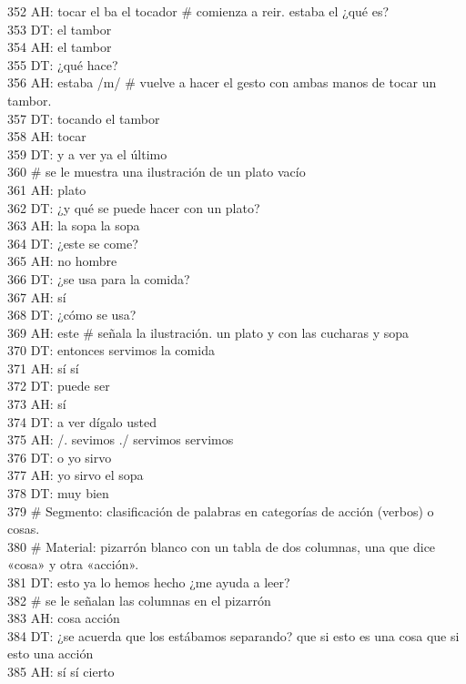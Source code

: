 352 AH: tocar el ba el tocador \# comienza a reir. estaba el ¿qué es?\\
353 DT: el tambor\\
354 AH: el tambor\\
355 DT: ¿qué hace?\\
356 AH: estaba /m/ \# vuelve a hacer el gesto con ambas manos de tocar un tambor.\\
357 DT: tocando el tambor\\
358 AH: tocar\\
359 DT: y a ver ya el último\\
360 \# se le muestra una ilustración de un plato vacío\\
361 AH: plato\\
362 DT: ¿y qué se puede hacer con un plato?\\
363 AH: la sopa la sopa\\
364 DT: ¿este se come?\\
365 AH: no hombre\\
366 DT: ¿se usa para la comida?\\
367 AH: sí\\
368 DT: ¿cómo se usa?\\
369 AH: este \# señala la ilustración. un plato y con las cucharas y sopa\\
370 DT: entonces servimos la comida\\
371 AH: sí sí\\
372 DT: puede ser\\
373 AH: sí\\
374 DT: a ver dígalo usted\\
375 AH: /. sevimos ./ servimos servimos\\
376 DT: o yo sirvo\\
377 AH: yo sirvo el sopa\\
378 DT: muy bien\\
379 \# Segmento: clasificación de palabras en categorías de acción (verbos) o cosas.\\
380 # Material: pizarrón blanco con un tabla de dos columnas, una  que dice «cosa» y otra «acción».\\
381 DT: esto ya lo hemos hecho ¿me ayuda a leer?\\
382 \# se le señalan las columnas en el pizarrón\\
383 AH: cosa acción\\
384 DT: ¿se acuerda que los estábamos separando? que si esto es una cosa que si esto una acción\\
385 AH: sí sí cierto\\
